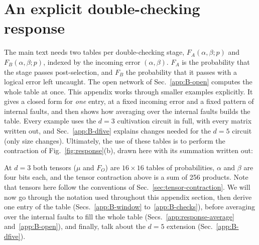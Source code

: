 
\section{An explicit double-checking response}\label{app:response}

The main text needs two tables per double-checking stage, $F_A(\alpha,\beta;p)$ and $F_B(\alpha,\beta;p)$, indexed by the incoming error $(\alpha,\beta)$. $F_A$ is the probability that the stage passes post-selection, and $F_B$ the probability that it passes with a logical error left uncaught.
The open network of Sec.~\ref{app:B-open} computes the whole table at once. This appendix works through smaller examples explicitly. It gives a closed form for \emph{one} entry, at a fixed incoming error and a fixed pattern of internal faults, and then shows how averaging over the internal faults builds the table.
Every example uses the $d=3$ cultivation circuit in full, with every matrix written out, and Sec.~\ref{app:B-dfive} explains changes needed for the $d=5$ circuit (only size changes).
Ultimately, the use of these tables is to perform the contraction of Fig.~\ref{fig:response}(b), drawn here with its summation written out:
\begin{center}
\end{center}
At $d=3$ both tensors ($\mu$ and $F_O$) are $16\times16$ tables of probabilities, $\alpha$ and $\beta$ are four bits each, and the tensor contraction above is a sum of 256 products. 
Note that tensors here follow the conventions of Sec.~\ref{sec:tensor-contraction}. 
We will now go through the notation used throughout this appendix section, then derive one entry of the table (Secs.~\ref{app:B-window} to~\ref{app:B-checks}), before averaging over the internal faults to fill the whole table (Secs.~\ref{app:response-average} and~\ref{app:B-open}), and finally, talk about the $d=5$ extension (Sec.~\ref{app:B-dfive}).

